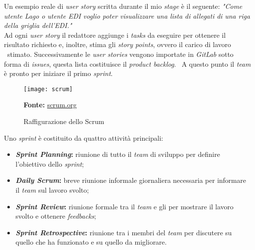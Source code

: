 Un esempio reale di \emph{user story} scritta durante il mio \emph{stage} è il seguente: 
\newline
\emph{"Come utente Lago o utente EDI voglio poter visualizzare una lista di allegati di una riga della griglia dell'EDI."} \\

Ad ogni \emph{user story} il redattore aggiunge i \emph{tasks} da eseguire per ottenere il risultato richiesto e, inoltre, stima gli \emph{story points}, ovvero il carico di lavoro \
stimato. Successivamente le \emph{user stories} vengono importate in \emph{GitLab} sotto forma di \emph{issues}, questa lista costituisce il \emph{product backlog}. \
A questo punto il \emph{team} è pronto per iniziare il primo \emph{sprint}. \\

\begin{figure}[!ht]
  \begin{center}
    \texttt{[image: scrum]}
    \caption{Raffigurazione dello Scrum}
    \textbf{Fonte:} \href{https://www.scrum.org}{scrum.org}
  \end{center}
\end{figure}

Uno \emph{sprint} è costituito da quattro attività principali:
\begin{itemize}
  \item \textbf{\emph{Sprint Planning}:} riunione di tutto il \emph{team} di sviluppo per definire l'obiettivo dello \emph{sprint};
  \item \textbf{\emph{Daily Scrum}:} breve riunione informale giornaliera necessaria per informare il \emph{team} sul lavoro svolto;
  \item \textbf{\emph{Sprint Review}:} riunione formale tra il \emph{team} e gli \emph{\glsplural{stakeholder}} per mostrare il lavoro svolto e ottenere \emph{feedbacks};
  \item \textbf{\emph{Sprint Retrospective}:} riunione tra i membri del \emph{team} per discutere su quello che ha funzionato e su quello da migliorare.
\end{itemize}

